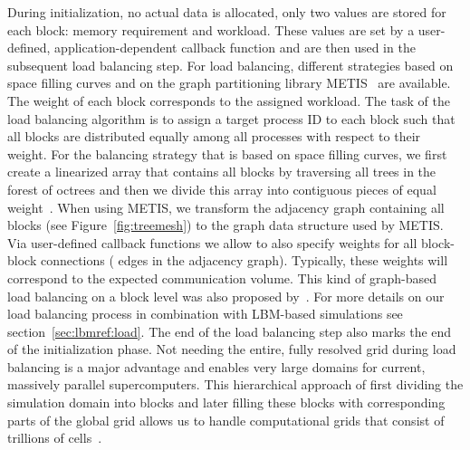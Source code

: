 \documentclass[final,leqno,onefignum,onetabnum]{siamltex1213}
\begin{document}
During initialization, no actual data is allocated, only two values are stored for each block: memory requirement and workload.
These values are set by a user-defined, application-dependent callback function and are then used in the subsequent load balancing step.
For load balancing, different strategies based on space filling curves and on the graph partitioning library METIS~\cite{karypis1999} are available.
The weight of each block corresponds to the assigned workload.
The task of the load balancing algorithm is to assign a target process ID to each block
such that all blocks are distributed equally among all processes with respect to their weight.
For the balancing strategy that is based on space filling curves, we first
create a linearized array that contains all blocks by traversing all trees in the forest of octrees
and then we divide this array into contiguous pieces of equal weight~\cite{Burstedde2011}.
When using METIS, we transform the adjacency graph containing all blocks (see Figure~\ref{fig:treemesh}) to the graph data structure used by METIS.
Via user-defined callback functions we allow to also specify weights for all block-block connections ( edges in the adjacency graph).
Typically, these weights will correspond to the expected communication volume.
This kind of graph-based load balancing on a block level was also proposed by~\cite{fietz2012}.
For more details on our load balancing process in combination with LBM-based simulations see section~\ref{sec:lbmref:load}.
The end of the load balancing step also marks the end of the initialization phase.
Not needing the entire, fully resolved grid during load balancing is a major advantage and enables very large domains for current, massively parallel supercomputers.
This hierarchical approach of first dividing the simulation domain into blocks and later filling these blocks with corresponding parts of the global grid
allows us to handle computational grids that consist of trillions of cells~\cite{Godenschwager2013}.
\end{document}
